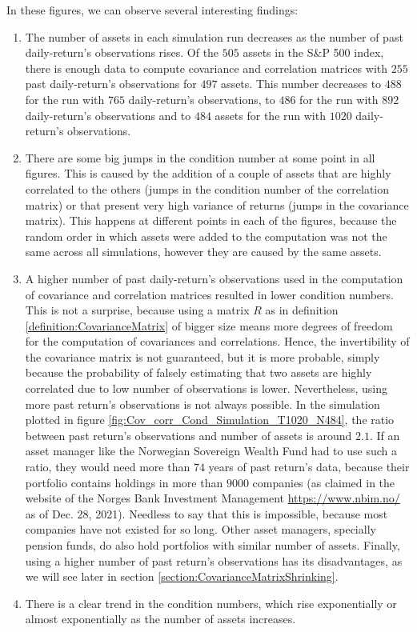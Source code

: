     	In these figures, we can observe several interesting findings:
    	\begin{enumerate}
    	    \item The number of assets in each simulation run decreases as the number of past daily-return's observations rises. Of the $505$ assets in the S\&P 500 index, there is enough data to compute covariance and correlation matrices with $255$ past daily-return's observations for $497$ assets. This number decreases to $488$ for the run with $765$ daily-return's observations, to $486$ for the run with $892$ daily-return's observations and to $484$ assets for the run with $1020$ daily-return's observations.
    	    
    	    \item There are some big jumps in the condition number at some point in all figures. This is caused by the addition of a couple of assets that are highly correlated to the others (jumps in the condition number of the correlation matrix) or that present very high variance of returns (jumps in the covariance matrix). This happens at different points in each of the figures, because the random order in which assets were added to the computation was not the same across all simulations, however they are caused by the same assets.
    	    
    	    \item A higher number of past daily-return's observations used in the computation of covariance and correlation matrices resulted in lower condition numbers. This is not a surprise, because using a matrix $R$ as in definition \ref{definition:CovarianceMatrix} of bigger size means more degrees of freedom for the computation of covariances and correlations. Hence, the invertibility of the covariance matrix is not guaranteed, but it is more probable, simply because the probability of falsely estimating that two assets are highly correlated due to low number of observations is lower. Nevertheless, using more past return's observations is not always possible. In the simulation plotted in figure \ref{fig:Cov_corr_Cond_Simulation_T1020_N484}, the ratio between past return's observations and number of assets is around $2.1$. If an asset manager like the Norwegian Sovereign Wealth Fund had to use such a ratio, they would need more than $74$ years of past return's data, because their portfolio contains holdings in more than $9000$ companies (as claimed in the website of the Norges Bank Investment Management \url{https://www.nbim.no/} as of Dec. 28, 2021). Needless to say that this is impossible, because most companies have not existed for so long. Other asset managers, specially pension funds, do also hold portfolios with similar number of assets. Finally, using a higher number of past return's observations has its disadvantages, as we will see later in section \ref{section:CovarianceMatrixShrinking}.
    	    
    	    \item There is a clear trend in the condition numbers, which rise exponentially or almost exponentially as the number of assets increases.
    	\end{enumerate}
    	
